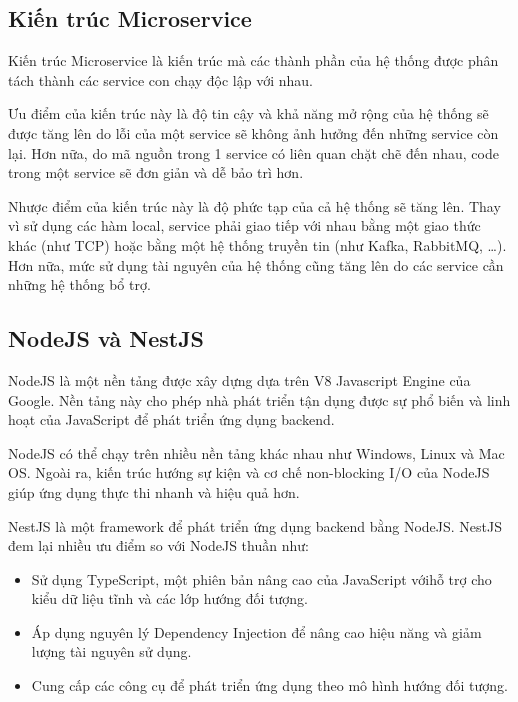 \documentclass[./../main.tex]{subfiles}
\begin{document}
\hypertarget{kiux1ebfn-truxfac-microservice}{%
\subsection{Kiến trúc
Microservice}\label{kiux1ebfn-truxfac-microservice}}

Kiến trúc Microservice \cite{Ric22a} là kiến trúc mà các thành phần của hệ thống được phân tách thành các service con chạy độc lập với nhau.

Ưu điểm của kiến trúc này là độ tin cậy và khả năng mở rộng của hệ thống
sẽ được tăng lên do lỗi của một service sẽ không ảnh hưởng đến những
service còn lại. Hơn nữa, do mã nguồn trong 1 service có liên quan chặt
chẽ đến nhau, code trong một service sẽ đơn giản và dễ bảo trì hơn.

Nhược điểm của kiến trúc này là độ phức tạp của cả hệ thống sẽ tăng lên.
Thay vì sử dụng các hàm local, service phải giao tiếp với nhau bằng một
giao thức khác (như TCP) hoặc bằng một hệ thống truyền tin (như Kafka,
RabbitMQ, \ldots). Hơn nữa, mức sử dụng tài nguyên của hệ thống cũng
tăng lên do các service cần những hệ thống bổ trợ.

\hypertarget{nodejs-vuxe0-nestjs}{%
\subsection{NodeJS và NestJS}\label{nodejs-vuxe0-nestjs}}

NodeJS \cite{Dah22} là một nền tảng được xây dựng dựa trên V8 Javascript Engine của
Google. Nền tảng này cho phép nhà phát triển tận dụng được sự phổ biến
và linh hoạt của JavaScript để phát triển ứng dụng backend.

NodeJS có thể chạy trên nhiều nền tảng khác nhau như Windows, Linux và
Mac OS. Ngoài ra, kiến trúc hướng sự kiện và cơ chế non-blocking I/O của
NodeJS giúp ứng dụng thực thi nhanh và hiệu quả hơn.

NestJS \cite{Mys22} là một framework để phát triển ứng dụng backend bằng NodeJS.
NestJS đem lại nhiều ưu điểm so với NodeJS thuần như:

\begin{itemize}
\item Sử dụng TypeScript, một phiên bản nâng cao của JavaScript vớihỗ trợ cho kiểu dữ liệu tĩnh và các lớp hướng đối tượng.
\item
  Áp dụng nguyên lý Dependency Injection để nâng cao hiệu năng và giảm
  lượng tài nguyên sử dụng.
\item
  Cung cấp các công cụ để phát triển ứng dụng theo mô hình hướng đối
  tượng.
\end{itemize}
\end{document}
